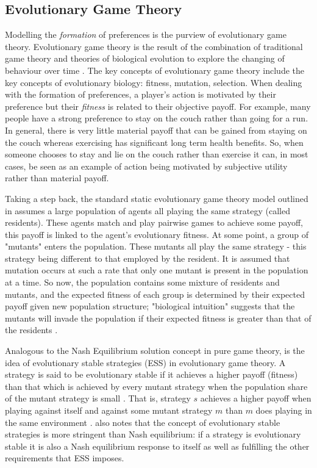\documentclass[11pt]{article}
\newcommand*{\np}{\par\noindent\newline}
\begin{document}
\subsection{Evolutionary Game Theory}\label{evo_games}
Modelling the \textit{formation} of preferences is the purview of evolutionary game theory. Evolutionary game theory is the result of the combination of traditional game theory and theories of biological evolution to explore the changing of behaviour over time \citep{tanimoto_fundamentals_2015}. The key concepts of evolutionary game theory include the key concepts of evolutionary biology: fitness, mutation, selection. When dealing with the formation of preferences, a player's action is motivated by their preference but their \textit{fitness} is related to their objective payoff. For example, many people have a strong preference to stay on the couch rather than going for a run. In general, there is very little material payoff that can be gained from staying on the couch whereas exercising has significant long term health benefits. So, when someone chooses to stay and lie on the couch rather than exercise it can, in most cases, be seen as an example of action being motivated by subjective utility rather than material payoff.

\np Taking a step back, the standard static evolutionary game theory model outlined in \citet{weibull_introduction_1992}
assumes a large population of agents all playing the same strategy (called residents). These agents match and play
pairwise games to achieve some payoff, this payoff is linked to the agent's evolutionary fitness. At some point, a group
of "mutants" enters the population. These mutants all play the same strategy - this strategy being different to that
employed by the resident. It is assumed that mutation occurs at such a rate that only one mutant is present in the
population at a time. So now, the population contains some mixture of residents and mutants, and the expected fitness of
each group is determined by their expected payoff given new population structure; "biological intuition" suggests that
the mutants will invade the population if their expected fitness is greater than that of the residents \citep[~p. 9]{weibull_introduction_1992}.

\np Analogous to the Nash Equilibrium solution concept in pure game theory, is the idea of evolutionary stable
strategies (ESS) in evolutionary game theory. A strategy is said to be evolutionary stable if it achieves a higher
payoff (fitness) than that which is achieved by every mutant strategy when the population share of the mutant strategy
is small \citep{weibull_introduction_1992}. That is, strategy $s$ achieves a higher payoff when playing against itself
and against some mutant strategy $m$ than $m$ does playing in the same environment \citep{shoham_multiagent_2008}. \citet{weibull_introduction_1992} also notes that the concept of evolutionary stable strategies is more stringent than Nash equilibrium: if a strategy is evolutionary stable it is also a Nash equilibrium response to itself
as well as fulfilling the other requirements that ESS imposes.
\end{document}
